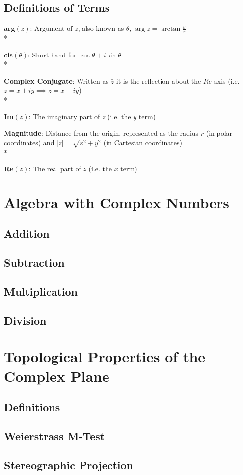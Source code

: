 \documentclass[]{article}
\begin{document}
    \subsection{Definitions of Terms}
        \noindent \textbf{arg$(z)$}: Argument of $z$, also known as $\theta$, $\arg{z}=\arctan{\frac{y}{x}}$ \\*
    
        \noindent \textbf{cis$(\theta)$}: Short-hand for $\cos{\theta}+i\sin{\theta}$ \\*
        
        \noindent \textbf{Complex Conjugate}: Written as $\bar{z}$ it is the reflection about the $Re$ axis (i.e. $z=x+iy \implies \bar{z}=x-iy$) \\*
        
        \noindent \textbf{Im$(z)$}: The imaginary part of $z$ (i.e. the $y$ term)
        
        \noindent \textbf{Magnitude}: Distance from the origin, represented as the radius $r$ (in polar coordinates) and $\left|z\right|=\sqrt{x^2+y^2}$ (in Cartesian coordinates) \\*
        
        \noindent \textbf{Re$(z)$}: The real part of $z$ (i.e. the $x$ term)
        
        
\section{Algebra with Complex Numbers}
    \subsection{Addition}
    \subsection{Subtraction}
    \subsection{Multiplication}
    \subsection{Division}
        
\section{Topological Properties of the Complex Plane}
    \subsection{Definitions}
    \subsection{Weierstrass M-Test}
    \subsection{Stereographic Projection}
\end{document}
